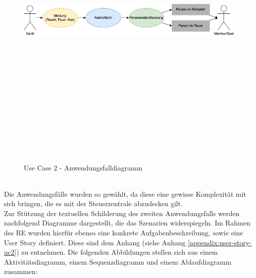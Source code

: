     \begin{figure}[hbt!]
        \centering
        \includegraphics[width=15cm,height=15cm,keepaspectratio]{images/UC2_Diagramm_Notfall.png}
        \caption{Use Case 2 - Anwendungsfalldiagramm}
        \label{fig:uc2-emergency}
    \end{figure}
    \\
    Die Anwendungsfälle wurden so gewählt, da diese eine gewisse Komplexität mit sich bringen, die es mit der Steuerzentrale 
    abzudecken gilt.
    \\
    \linebreak
    Zur Stützung der textuellen Schilderung des zweiten Anwendungsfalls werden nachfolgend Diagramme dargestellt, die das Szenarien 
    widerspiegeln. Im Rahmen des \acs{RE} wurden hierfür ebenso eine konkrete Aufgabenbeschreibung, sowie eine User Story definiert. Diese sind dem 
    Anhang (siehe Anhang \ref{appendix:user-story-uc2}) zu entnehmen. Die folgenden Abbildungen stellen sich aus einem 
    Aktivitätsdiagramm, einem Sequenzdiagramm und einem Ablaufdiagramm zusammen: 
    